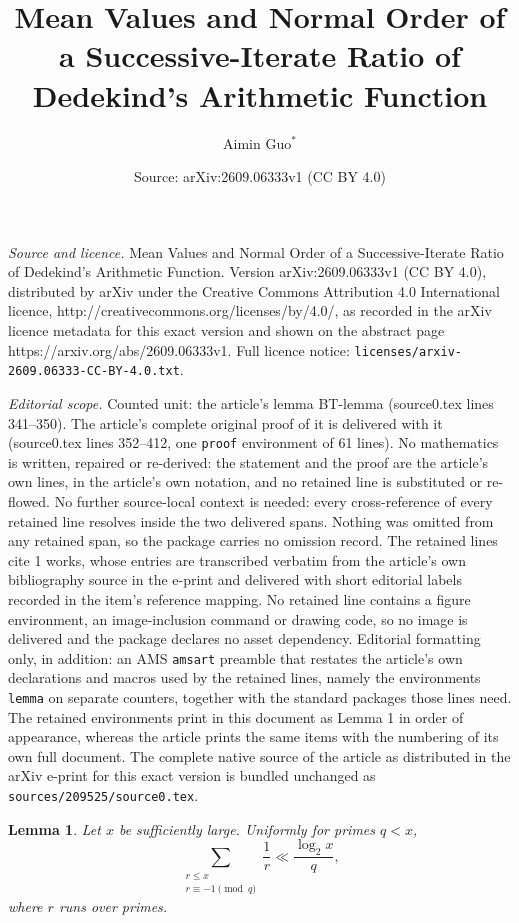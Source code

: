 \documentclass[10pt,a4paper]{amsart}
\title{Mean Values and Normal Order of a Successive-Iterate Ratio of Dedekind's Arithmetic Function}
\author{Aimin Guo$^{*}$}
\date{Source: arXiv:2609.06333v1 (CC BY 4.0)}
\newtheorem{lemma}{Lemma}
\begin{document}
\maketitle

\noindent\emph{Source and licence.} Mean Values and Normal Order of a Successive-Iterate Ratio of Dedekind's Arithmetic Function. Version arXiv:2609.06333v1 (CC BY 4.0), distributed by arXiv under the Creative Commons Attribution 4.0 International licence, http://creativecommons.org/licenses/by/4.0/, as recorded in the arXiv licence metadata for this exact version and shown on the abstract page https://arxiv.org/abs/2609.06333v1. Full licence notice: \texttt{licenses/arxiv-2609.06333-CC-BY-4.0.txt}.\par\smallskip

\noindent\textit{Editorial scope.} Counted unit: the article's lemma BT-lemma (source0.tex lines 341--350). The article's complete original proof of it is delivered with it (source0.tex lines 352--412, one \texttt{proof} environment of 61 lines). No mathematics is written, repaired or re-derived: the statement and the proof are the article's own lines, in the article's own notation, and no retained line is substituted or re-flowed.  No further source-local context is needed: every cross-reference of every retained line resolves inside the two delivered spans.  Nothing was omitted from any retained span, so the package carries no omission record.  The retained lines cite 1 works, whose entries are transcribed verbatim from the article's own bibliography source in the e-print and delivered with short editorial labels recorded in the item's reference mapping.  No retained line contains a figure environment, an image-inclusion command or drawing code, so no image is delivered and the package declares no asset dependency.  Editorial formatting only, in addition: an AMS \texttt{amsart} preamble that restates the article's own declarations and macros used by the retained lines, namely the environments \texttt{lemma} on separate counters, together with the standard packages those lines need.  The retained environments print in this document as Lemma 1 in order of appearance, whereas the article prints the same items with the numbering of its own full document.  The complete native source of the article as distributed in the arXiv e-print for this exact version is bundled unchanged as \texttt{sources/209525/source0.tex}.
\begin{lemma}\label{BT-lemma}
Let \(x\) be sufficiently large. Uniformly for primes \(q<x\),
\[
\sum_{\substack{r\le x\\r\equiv-1\pmod q}}
\frac1r
\ll
\frac{\log_2x}{q},
\]
where \(r\) runs over primes.
\end{lemma}
\end{document}
